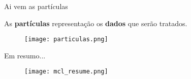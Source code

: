 


%
%                
%            
%   
%    


\begin{frame}[t]{Ai vem as partículas}

    As \textbf{partículas} representação os \textbf{dados} que serão tratados. 
    \begin{figure}

        \texttt{[image: particulas.png]}%
        
    
    \end{figure}
\end{frame}


\begin{frame}[t]{Em resumo...}

    
    \begin{figure}

        \texttt{[image: mcl\_resume.png]}%
        
    
    \end{figure}
\end{frame}

